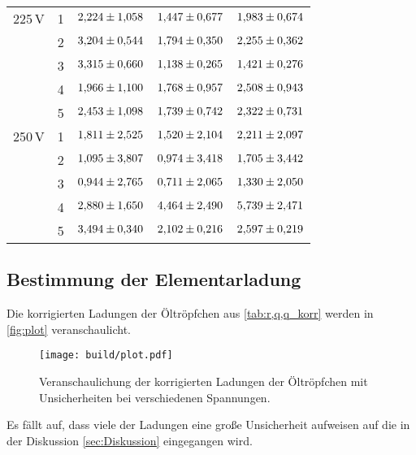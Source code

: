 \begin{table}[H]
\begin{tabular}{S S S S S}
        {225\,V}    & 1 &   $\num{2.224+-1.058}$ & $\num{1.447+-0.677}$ & $\num{1.983+-0.674}$\\
        {}          & 2 &   $\num{3.204+-0.544}$ & $\num{1.794+-0.350}$ & $\num{2.255+-0.362}$\\
        {}          & 3 &   $\num{3.315+-0.660}$ & $\num{1.138+-0.265}$ & $\num{1.421+-0.276}$\\
        {}          & 4 &   $\num{1.966+-1.100}$ & $\num{1.768+-0.957}$ & $\num{2.508+-0.943}$\\
        {}          & 5 &   $\num{2.453+-1.098}$ & $\num{1.739+-0.742}$ & $\num{2.322+-0.731}$\\
        {250\,V}    & 1 &   $\num{1.811+-2.525}$ & $\num{1.520+-2.104}$ & $\num{2.211+-2.097}$\\
        {}          & 2 &   $\num{1.095+-3.807}$ & $\num{0.974+-3.418}$ & $\num{1.705+-3.442}$\\
        {}          & 3 &   $\num{0.944+-2.765}$ & $\num{0.711+-2.065}$ & $\num{1.330+-2.050}$\\
        {}          & 4 &   $\num{2.880+-1.650}$ & $\num{4.464+-2.490}$ & $\num{5.739+-2.471}$\\
        {}          & 5 &   $\num{3.494+-0.340}$ & $\num{2.102+-0.216}$ & $\num{2.597+-0.219}$\\ 
        \bottomrule
    \end{tabular}
  \end{table}

\subsection{Bestimmung der Elementarladung}
Die korrigierten Ladungen der Öltröpfchen aus \autoref{tab:r,q,q_korr} werden in \autoref{fig:plot} veranschaulicht.
  \begin{figure}[H]
    \centering
    \texttt{[image: build/plot.pdf]}
    \caption{Veranschaulichung der korrigierten Ladungen der Öltröpfchen mit Unsicherheiten bei verschiedenen Spannungen.}
    \label{fig:plot}
\end{figure}
Es fällt auf, dass viele der Ladungen eine große Unsicherheit aufweisen auf die in der Diskussion \ref{sec:Diskussion} 
eingegangen wird.

